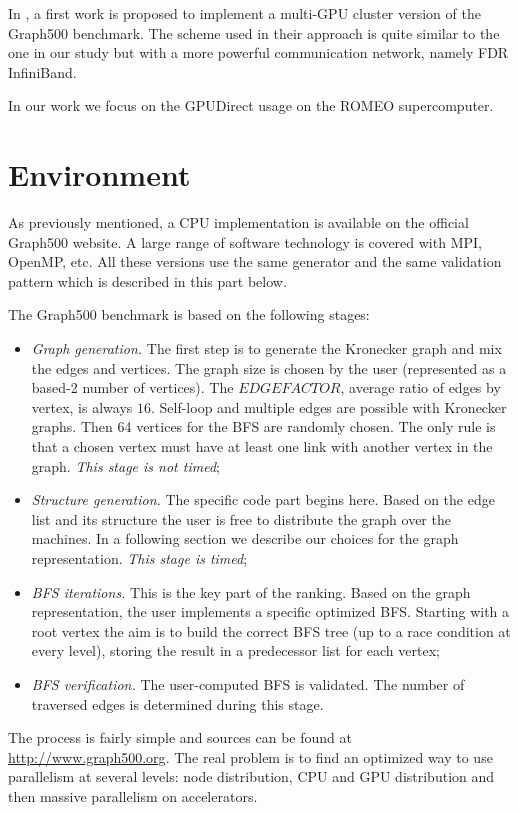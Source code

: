In \cite{fu2014parallel}, a first work is proposed to implement a multi-GPU cluster version of the Graph500 benchmark. 
The scheme used in their approach is quite similar to the one in our study but with a more powerful communication network, namely FDR InfiniBand. 

In our work we focus on the GPUDirect usage on the ROMEO supercomputer. 

\section{Environment}
As previously mentioned, a CPU implementation is available on the official Graph500 website. 
A large range of software technology is covered with MPI, OpenMP, etc. 
All these versions use the same generator and the same validation pattern which is described in this part below. 

The Graph500 benchmark is based on the following stages:
\begin{itemize}
	\item \textit{Graph generation.} The first step is to generate the Kronecker graph and mix the edges and vertices. 
	The graph size is chosen by the user (represented as a based-2 number of vertices). The $EDGEFACTOR$, average ratio of edges by vertex, is always $16$. 
	Self-loop and multiple edges are possible with Kronecker graphs.
	Then 64 vertices for the BFS are randomly chosen. 
	The only rule is that a chosen vertex must have at least one link with another vertex in the graph. \textit{This stage is not timed};
	\item \textit{Structure generation.} The specific code part begins here. 
	Based on the edge list and its structure the user is free to distribute the graph over the machines. 
	In a following section we describe our choices for the graph representation. \textit{This stage is timed};
	\item \textit{BFS iterations.} This is the key part of the ranking. Based on the graph representation, the user implements a specific optimized BFS. Starting with a root vertex the aim is to build the correct BFS tree (up to a race condition at every level), storing the result in a predecessor list for each vertex;
	\item \textit{BFS verification.} The user-computed BFS is validated. The number of traversed edges is determined during this stage.  
\end{itemize}

The process is fairly simple and sources can be found at \url{http://www.graph500.org}.
The real problem is to find an optimized way to use parallelism at several levels: node distribution, CPU and GPU distribution and then massive parallelism on accelerators.



